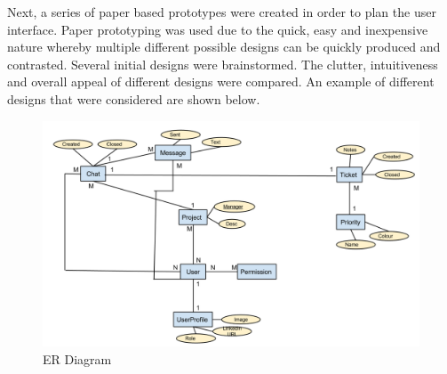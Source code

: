 \documentclass[a4paper]{l3proj}
\begin{document}
Next, a series of paper based prototypes were created in order to plan the user interface. Paper prototyping was used due to the quick, easy and inexpensive nature whereby multiple different possible designs can be quickly produced and contrasted. Several initial designs were brainstormed. The clutter, intuitiveness and overall appeal of different designs were compared.  An example of different designs that were considered are shown below.

\begin{figure}
\centering
\includegraphics[scale=0.4]{ER_Diagram}
\caption{ER Diagram}
\label{figure:ERDiagram1}
\end{figure} 
\end{document}

